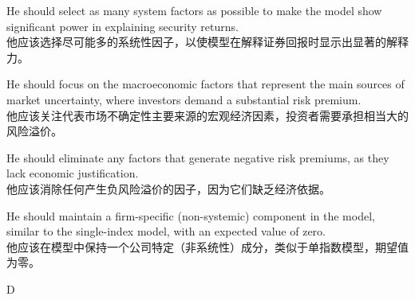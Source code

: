 \documentclass{article}
\begin{document}
\begin{choices}
    \item He should select as many system factors as possible to make the model show significant power in explaining security returns.
    \\
    他应该选择尽可能多的系统性因子，以使模型在解释证券回报时显示出显著的解释力。
    \item He should focus on the macroeconomic factors that represent the main sources of market uncertainty, where investors demand a substantial risk premium.
    \\
    他应该关注代表市场不确定性主要来源的宏观经济因素，投资者需要承担相当大的风险溢价。
    \item He should eliminate any factors that generate negative risk premiums, as they lack economic justification.
    \\
    他应该消除任何产生负风险溢价的因子，因为它们缺乏经济依据。
    \item He should maintain a firm-specific (non-systemic) component in the model, similar to the single-index model, with an expected value of zero.
    \\
    他应该在模型中保持一个公司特定（非系统性）成分，类似于单指数模型，期望值为零。
\end{choices}

\begin{correctanswer}
    D
\end{correctanswer}
\end{document}
